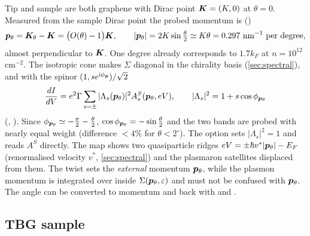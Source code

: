 Tip and sample are both graphene with Dirac point $\bm K=(K,0)$ at $\theta=0$. Measured from the sample Dirac
point the probed momentum is ()
\begin{equation}
\bm p_\theta=\bm K_\theta-\bm K=\bigl(O(\theta)-1\bigr)\bm K,\qquad |\bm p_\theta|=2K\sin\tfrac{\theta}{2}\simeq K\theta
=0.297\ \text{nm}^{-1}\ \text{per degree},
\label{eq:ptheta}
\end{equation}
almost perpendicular to $\bm K$. One degree already corresponds to $1.7k_F$ at $n=10^{12}$ cm$^{-2}$. The isotropic
cone makes $\Sigma$ diagonal in the chirality basis (\cref{sec:spectral}), and with the spinor $(1,se^{\mathrm i\phi_{\bm p}})/\sqrt2$
\begin{equation}
\frac{dI}{dV}=e^2\Gamma\sum_{s=\pm}|\Lambda_s(\bm p_\theta)|^2A^S_s(\bm p_\theta,eV),\qquad
|\Lambda_s|^2=1+s\cos\phi_{\bm p_\theta}
\label{eq:didvslg}
\end{equation}
(, ). Since $\phi_{\bm p_\theta}\simeq-\frac{\pi}{2}-\frac{\theta}{2}$,
$\cos\phi_{\bm p_\theta}=-\sin\frac\theta2$ and the two bands are probed with nearly equal weight (difference
$<4\%$ for $\theta<2^\circ$). The option  sets $|\Lambda_s|^2=1$ and reads $A^S$ directly.
The map shows two quasiparticle ridges $eV=\pm\hbar v^*|\bm p_\theta|-E_F$ (renormalised velocity $v^*$, \cref{sec:spectral})
and the plasmaron satellites displaced from them. The twist sets the \emph{external} momentum $\bm p_\theta$, while the
plasmon momentum is integrated over inside $\Sigma(\bm p_\theta,\varepsilon)$ and must not be confused with $\bm p_\theta$.
The angle can be converted to momentum and back with  and .

\subsection{TBG sample}
\label{sec:qtmtbg}


